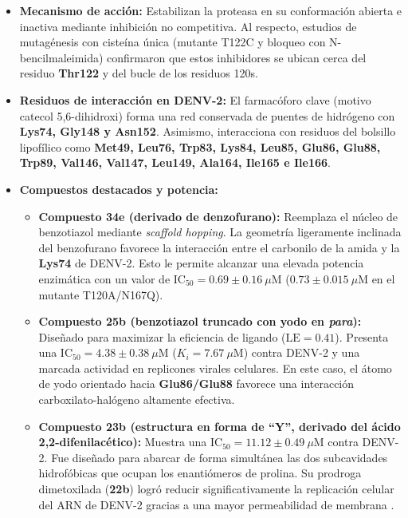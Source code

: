 \begin{itemize}
    \item \textbf{Mecanismo de acción:} Estabilizan la proteasa en su conformación abierta e inactiva mediante inhibición no competitiva. Al respecto, estudios de mutagénesis con cisteína única (mutante T122C y bloqueo con N-bencilmaleimida) confirmaron que estos inhibidores se ubican cerca del residuo \textbf{Thr122} y del bucle de los residuos 120s.
    \item \textbf{Residuos de interacción en DENV-2:} El farmacóforo clave (motivo catecol 5,6-dihidroxi) forma una red conservada de puentes de hidrógeno con \textbf{Lys74, Gly148 y Asn152}. Asimismo, interacciona con residuos del bolsillo lipofílico como \textbf{Met49, Leu76, Trp83, Lys84, Leu85, Glu86, Glu88, Trp89, Val146, Val147, Leu149, Ala164, Ile165 e Ile166}.
    \item \textbf{Compuestos destacados y potencia:}
    \begin{itemize}
        \item \textbf{Compuesto 34e (derivado de denzofurano):} Reemplaza el núcleo de benzotiazol mediante \textit{scaffold hopping}. La geometría ligeramente inclinada del benzofurano favorece la interacción entre el carbonilo de la amida y la \textbf{Lys74} de DENV-2. Esto le permite alcanzar una elevada potencia enzimática con un valor de $\text{IC}_{50} = 0.69 \pm 0.16\ \mu\text{M}$ ($0.73 \pm 0.015\ \mu\text{M}$ en el mutante T120A/N167Q).
        \item \textbf{Compuesto 25b (benzotiazol truncado con yodo en \textit{para}):} Diseñado para maximizar la eficiencia de ligando ($\text{LE} = 0.41$). Presenta una $\text{IC}_{50} = 4.38 \pm 0.38\ \mu\text{M}$ ($K_i = 7.67\ \mu\text{M}$) contra DENV-2 y una marcada actividad en replicones virales celulares. En este caso, el átomo de yodo orientado hacia \textbf{Glu86/Glu88} favorece una interacción carboxilato-halógeno altamente efectiva.
        \item \textbf{Compuesto 23b (estructura en forma de ``Y'', derivado del ácido 2,2-difenilacético):} Muestra una $\text{IC}_{50} = 11.12 \pm 0.49\ \mu\text{M}$ contra DENV-2. Fue diseñado para abarcar de forma simultánea las dos subcavidades hidrofóbicas que ocupan los enantiómeros de prolina. Su prodroga dimetoxilada (\textbf{22b}) logró reducir significativamente la replicación celular del ARN de DENV-2 gracias a una mayor permeabilidad de membrana \cite{maus2021sar}.
    \end{itemize}
\end{itemize}


